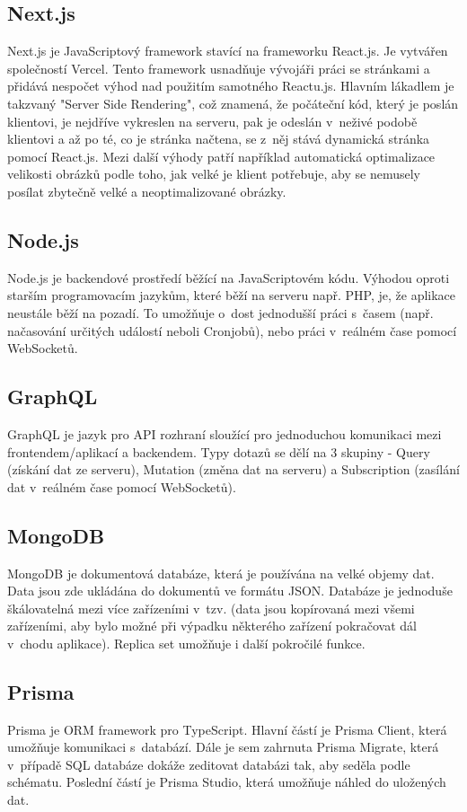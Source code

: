 \subsection{Next.js}
Next.js je JavaScriptový framework stavící na frameworku React.js. Je vytvářen společností Vercel. Tento framework usnadňuje vývojáři práci se stránkami a přidává nespočet výhod nad použitím samotného Reactu.js. Hlavním lákadlem je takzvaný "Server Side Rendering", což znamená, že počáteční kód, který je poslán klientovi, je nejdříve vykreslen na serveru, pak je odeslán v~neživé podobě klientovi a až po té, co je stránka načtena, se z~něj stává dynamická stránka pomocí React.js. Mezi další výhody patří například automatická optimalizace velikosti obrázků podle toho, jak velké je klient potřebuje, aby se nemusely posílat zbytečně velké a neoptimalizované obrázky.

\subsection{Node.js}
Node.js je backendové prostředí běžící na JavaScriptovém kódu. Výhodou oproti starším programovacím jazykům, které běží na serveru např. PHP, je, že aplikace neustále běží na pozadí. To umožňuje o~dost jednodušší práci s~časem (např. načasování určitých událostí neboli Cronjobů), nebo práci v~reálném čase pomocí WebSocketů.

\subsection{GraphQL}
GraphQL je jazyk pro API rozhraní sloužící pro jednoduchou komunikaci mezi frontendem/aplikací a backendem. Typy dotazů se dělí na 3 skupiny - Query (získání dat ze serveru), Mutation (změna dat na serveru) a Subscription (zasílání dat v~reálném čase pomocí WebSocketů).

\subsection{MongoDB}
MongoDB je dokumentová databáze, která je používána na velké objemy dat. Data jsou zde ukládána do dokumentů ve formátu JSON. Databáze je jednoduše škálovatelná mezi více zařízeními v~tzv.  (data jsou kopírovaná mezi všemi zařízeními, aby bylo možné při výpadku některého zařízení pokračovat dál v~chodu aplikace). Replica set umožňuje i další pokročilé funkce.

\subsection{Prisma}
Prisma je ORM framework pro TypeScript. Hlavní částí je Prisma Client, která umožňuje komunikaci s~databází. Dále je sem zahrnuta Prisma Migrate, která v~případě SQL databáze dokáže zeditovat databázi tak, aby seděla podle schématu. Poslední částí je Prisma Studio, která umožňuje náhled do uložených dat.\cite{Prisma}

